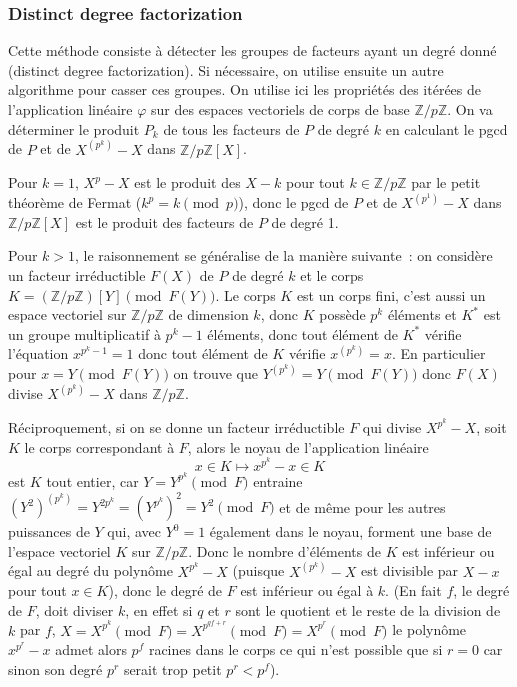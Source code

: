 \documentclass[a4paper,11pt]{article}
\newcommand{\Z}{{\mathbb{Z}}}
\begin{document}
\begin{giacjshere}
\subsubsection{Distinct degree factorization} 
Cette méthode consiste à détecter les groupes de facteurs
ayant un degré donné (distinct degree factorization). Si nécessaire, 
on utilise ensuite un autre algorithme pour casser ces groupes.
On utilise ici les propriétés des itérées de l'application linéaire 
$\varphi$ sur des espaces vectoriels de corps de base $\Z/p\Z$.
On va déterminer le produit $P_k$ de tous les facteurs de $P$ de degré $k$
en calculant le pgcd de $P$ et de $X^{(p^k)}-X$ dans $\Z/p\Z[X]$.

Pour $k=1$, $X^p-X$ est le produit des $X-k$ pour tout $k\in \Z/p\Z$
par le petit théorème de Fermat ($k^p=k \pmod p$), donc le pgcd
de $P$ et de $X^{(p^1)}-X$ dans $\Z/p\Z[X]$ est le produit des facteurs
de $P$ de degré 1.

Pour $k>1$, le raisonnement se généralise de la manière suivante~: on
considère un facteur irréductible $F(X)$ de $P$ de degré $k$ et le corps
$K=(\Z/p\Z)[Y] \pmod{F(Y)}$. Le corps $K$ est un corps fini, c'est
aussi un espace vectoriel sur $\Z/p\Z$ de dimension $k$, donc $K$ possède
$p^k$ éléments et $K^*$ est un groupe multiplicatif à $p^k-1$ éléments,
donc tout élément de $K^*$ vérifie l'équation $x^{p^k-1}=1$ donc
tout élément de $K$ vérifie $x^{(p^k)}=x$. En particulier pour 
$x=Y \pmod {F(Y)}$ 
on trouve que $Y^{(p^k)}=Y \pmod {F(Y)}$ donc $F(X)$ divise $X^{(p^k)}-X$
dans $\Z/p\Z$.

Réciproquement, si on se donne un facteur irréductible $F$ qui divise
$X^{p^k}-X$, soit $K$ le corps correspondant à $F$, 
alors le noyau de l'application linéaire
\[ x \in K \mapsto x^{p^k}-x \in K \]
est $K$ tout entier, car $Y=Y^{p^k} \pmod F$
entraine $(Y^2)^{(p^k)}=Y^{2 p^k}=(Y^{p^k})^2=Y^2 \pmod F$ et de même
pour les autres puissances de $Y$ qui, avec $Y^0=1$ également dans le
noyau, forment une base de l'espace vectoriel $K$ sur $\Z/p\Z$. Donc le
nombre d'éléments de $K$ est inférieur ou égal au degré du polynôme
$X^{p^k}-X$ (puisque $X^{(p^k)}-X$ est divisible par
$X-x$ pour tout $x\in K$),
donc le degré de $F$ est inférieur ou égal à $k$.
(En fait $f$, le degré de $F$, doit diviser $k$, en effet
si $q$ et $r$ sont le quotient et le reste de la division de $k$ par $f$,
$X=X^{p^k} \pmod F =X^{p^{qf+r}} \pmod F=X^{p^r} \pmod F$
le polyn\^ome $x^{p^r}-x$ admet alors $p^f$ racines dans le corps
ce qui n'est possible que si $r=0$ car sinon son degr\'e 
$p^r$ serait trop petit $p^r<p^f$).


\end{giacjshere}
\end{document}
